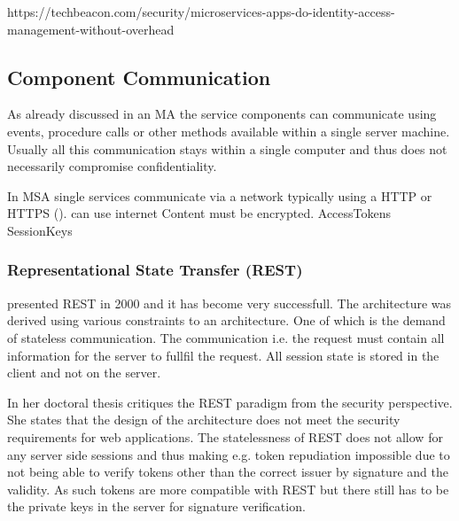 https://techbeacon.com/security/microservices-apps-do-identity-access-management-without-overhead



\subsection{Component Communication}
\begin{sloppypar}
    As already discussed in an MA the service components can communicate using 
    events, procedure calls or other methods available within a single server 
    machine. Usually all this communication stays within a single computer and 
    thus does not necessarily compromise confidentiality.
\end{sloppypar}
\begin{sloppypar}
    In MSA single services communicate via a network typically using a HTTP or HTTPS (). 
    can use internet
    Content must be encrypted.
    AccessTokens
    SessionKeys
\end{sloppypar}




\subsubsection{Representational State Transfer (REST)}
\begin{sloppypar}
    \citet{restroy} presented REST in 2000 and it has become very successfull. 
    The architecture was derived using various constraints to an architecture.
    One of which is the demand of stateless communication. The communication i.e. 
    the request must contain all information for the server to fullfil the request. 
    All session state is stored in the client and not on the server.
\end{sloppypar}
\begin{sloppypar}
    In her doctoral thesis \citet{secchalmsa} critiques the REST paradigm from 
    the security perspective. She states that the design of the architecture 
    does not meet the security requirements for web applications. The 
    statelessness of REST does not allow for any server side sessions and thus 
    making e.g. token repudiation impossible due to not being able to verify 
    tokens other than the correct issuer by signature and the validity. As such 
    tokens are more compatible with REST but there still has to be the private 
    keys in the server for signature verification.
\end{sloppypar}




